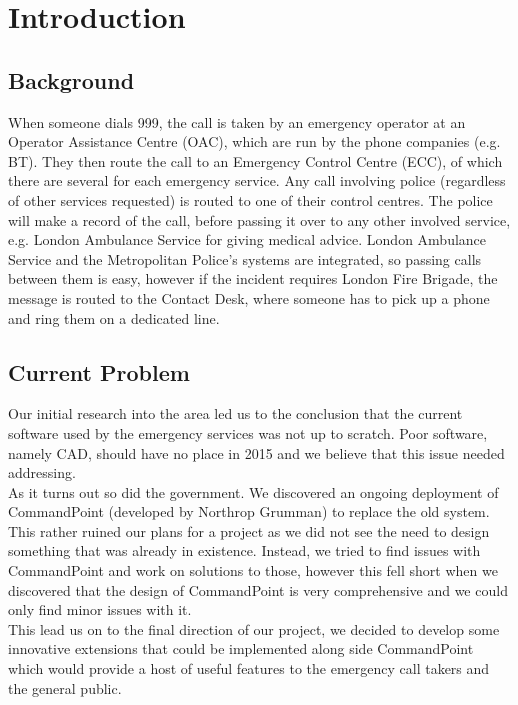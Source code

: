 \documentclass{article}
\begin{document}
\pagebreak
    \section{Introduction}
    \subsection{Background}
    When someone dials 999, the call is taken by an emergency operator at an Operator Assistance Centre (OAC), which are run by the phone companies (e.g. BT). They then route the call to an Emergency Control Centre (ECC), of which there are several for each emergency service. Any call involving police (regardless of other services requested) is routed to one of their control centres. The police will make a record of the call, before passing it over to any other involved service, e.g. London Ambulance Service for giving medical advice. London Ambulance Service and the Metropolitan Police's systems are integrated, so passing calls between them is easy, however if the incident requires London Fire Brigade, the message is routed to the Contact Desk, where someone has to pick up a phone and ring them on a dedicated line.

    \subsection{Current Problem}
    Our initial research into the area led us to the conclusion that the current software used by the emergency services was not up to scratch. Poor software, namely CAD, should have no place in 2015 and we believe that this issue needed addressing.\\
    
    As it turns out so did the government. We discovered an ongoing deployment of CommandPoint (developed by Northrop Grumman) to replace the old system. This rather ruined our plans for a project as we did not see the need to design something that was already in existence. Instead, we tried to find issues with CommandPoint and work on solutions to those, however this fell short when we discovered that the design of CommandPoint is very comprehensive and we could only find minor issues with it.\\
    
    This lead us on to the final direction of our project, we decided to develop some innovative extensions that could be implemented along side CommandPoint which would provide a host of useful features to the emergency call takers and the general public. 
    
\end{document}
